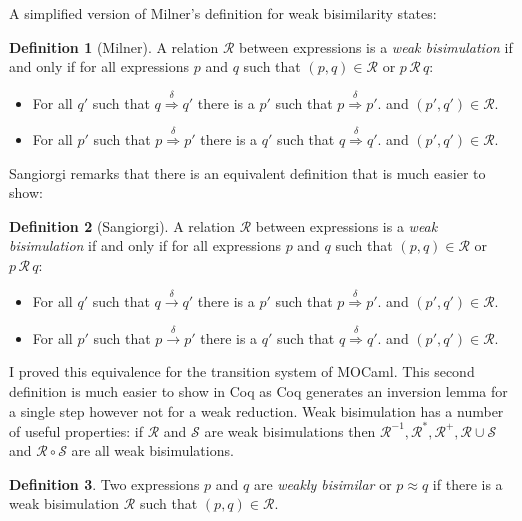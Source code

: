\documentclass[12pt,twoside,notitlepage]{report}
\theoremstyle{plain}%
\theoremstyle{definition}
\newtheorem{defn}{Definition}[section]
\theoremstyle{remark}
\begin{document}
A simplified version of Milner's definition for weak bisimilarity states:
\begin{defn}[Milner]
A relation $ \mathcal{R} $ between expressions is a \textit{weak bisimulation} if and only if for all expressions $ p $ and $ q $ such that $ (p,q)\in \mathcal{R} $ or $ p\, \mathcal{R}\, q $:
\begin{itemize}
\item{For all $ q' $ such that $ q \overset{\delta}{\Rightarrow} q' $ there is a $ p' $ such that $ p \overset{\delta}{\Rightarrow} p' $. and $ (p', q') \in \mathcal{R}$. }
\item{For all $ p' $ such that $ p \overset{\delta}{\Rightarrow} p' $ there is a $ q' $ such that $ q \overset{\delta}{\Rightarrow} q' $. and $ (p', q') \in \mathcal{R}$. }
\end{itemize}
\end{defn}

Sangiorgi\cite{sangiorgi1992problem} remarks that there is an equivalent definition that is much easier to show:
\begin{defn}[Sangiorgi]
A relation $ \mathcal{R} $ between expressions is a \textit{weak bisimulation} if and only if for all expressions $ p $ and $ q $ such that $ (p,q)\in \mathcal{R} $ or $ p\, \mathcal{R}\, q $:
\begin{itemize}
\item{For all $ q' $ such that $ q \overset{\delta}{\rightarrow} q' $ there is a $ p' $ such that $ p \overset{\delta}{\Rightarrow} p' $. and $ (p', q') \in \mathcal{R}$. }
\item{For all $ p' $ such that $ p \overset{\delta}{\rightarrow} p' $ there is a $ q' $ such that $ q \overset{\delta}{\Rightarrow} q' $. and $ (p', q') \in \mathcal{R}$. }
\end{itemize}
\end{defn}

I proved this equivalence for the transition system of MOCaml. This second definition is much easier to show in Coq as Coq generates an inversion lemma for a single step however not for a weak reduction. Weak bisimulation has a number of useful properties: if $ \mathcal{R} $ and $ \mathcal{S} $ are weak bisimulations then $ \mathcal{R}^{-1}, \mathcal{R}^*, \mathcal{R}^+, \mathcal{R}\cup\mathcal{S}$  and $\mathcal{R} \circ \mathcal{S} $ are all weak bisimulations.
\begin{defn}
\label{defn:weak_bisimilarity}
Two expressions $ p $ and $ q $ are \textit{weakly bisimilar} or $ p\approx q $ if there is a weak bisimulation $ \mathcal{R} $ such that $ (p,q) \in \mathcal{R} $.
\end{defn}
\end{document}

